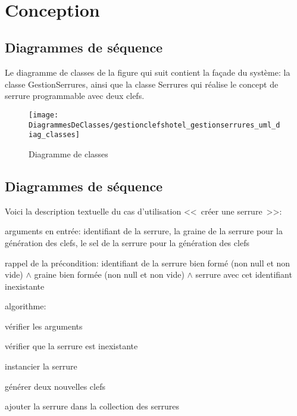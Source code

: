 \documentclass[11pt,article]{article}
\newcommand{\nullvalue}{\textsf{null}\xspace}
\begin{document}
\newpage~\newpage

\section{Conception}
\label{SS_simserrures_conception}

\subsection{Diagrammes de séquence}

Le diagramme de classes de la figure qui suit contient la façade du
système: la classe \textsf{GestionSerrures}, ainsi que la classe
\textsf{Serrures} qui réalise le concept de serrure programmable avec
deux clefs.

\begin{figure}[!ht]
\begin{center}
\texttt{[image: DiagrammesDeClasses/gestionclefshotel\_gestionserrures\_uml\_diag\_classes]}
\caption{Diagramme de classes}
\end{center}
\label{umlet_simserrures_diag_classes}
\end{figure}

\newpage

\subsection{Diagrammes de séquence}

Voici la description textuelle du cas d'utilisation <<~créer une serrure~>>:
\begin{compactitem}
\item arguments en entrée: identifiant de la serrure, la graine de la
  serrure pour la génération des clefs, le sel de la serrure pour la
  génération des clefs
\item rappel de la précondition: identifiant de la serrure bien
  formé (non \nullvalue et non vide) $\land$ graine bien formée (non
  \nullvalue et non vide) $\land$ serrure avec cet identifiant
  inexistante
\item algorithme:
\begin{compactenum}
\item vérifier les arguments
\item vérifier que la serrure est inexistante
\item instancier la serrure
  \begin{compactitem}
  \item générer deux nouvelles clefs
  \end{compactitem}
\item ajouter la serrure dans la collection des serrures
\end{compactenum}
\end{compactitem}
\end{document}
